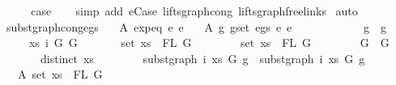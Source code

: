 \begin{isabellebody}
\ \ \isamarkupfalse%
\ \isamarkupfalse%
\ {\isacharquery}{\kern0pt}case\isanewline
\ \ \isamarkupfalse%
\ {\isacharparenleft}{\kern0pt}simp\ add{\isacharcolon}{\kern0pt}\ e{\isacharunderscore}{\kern0pt}Case\ lifts{\isacharunderscore}{\kern0pt}graph{\isacharunderscore}{\kern0pt}cong\ lifts{\isacharunderscore}{\kern0pt}graph{\isacharunderscore}{\kern0pt}freelinks{\isacharparenright}{\kern0pt}\isanewline
{}\isamarkupfalse%
\ auto%
\endisatagproof
{\isafoldproof}%
%
\isadelimproof
\isanewline
%
\endisadelimproof
\isanewline
\isanewline
{}\isamarkupfalse%
\ subst{\isacharunderscore}{\kern0pt}graph{\isacharunderscore}{\kern0pt}cong{\isacharunderscore}{\kern0pt}egs{}{\isacharcolon}{\kern0pt}\isanewline
\ \ \ A{}{\isacharcolon}{\kern0pt}\ {\isachardoublequoteopen}expeq\ e{}\ e{}{\isachardoublequoteclose}\isanewline
\ \ \ A{}{\isacharcolon}{\kern0pt}\ {\isachardoublequoteopen}{\isasymforall}{\isacharparenleft}{\kern0pt}g{}{\isacharcomma}{\kern0pt}\ g{}{\isacharparenright}{\kern0pt}{\isasymin}set\ {\isacharparenleft}{\kern0pt}egs\ e{}\ e{}{\isacharparenright}{\kern0pt}{\isachardot}{\kern0pt}\isanewline
\ \ \ \ \ \ \ \ \ \ \ \ g{}\ {\isasymsimeq}\ g{}\ {\isasymand}\isanewline
\ \ \ \ \ {\isacharparenleft}{\kern0pt}{\isasymforall}xs\ i\ G{}\ G{}{\isachardot}{\kern0pt}\isanewline
\ \ \ \ \ \ \ set\ xs\ {\isacharequal}{\kern0pt}\ FL\ G{}\ {\isacharminus}{\kern0pt}{\isacharminus}{\kern0pt}{\isachargreater}{\kern0pt}\isanewline
\ \ \ \ \ \ \ set\ xs\ {\isacharequal}{\kern0pt}\ FL\ G{}\ {\isacharminus}{\kern0pt}{\isacharminus}{\kern0pt}{\isachargreater}{\kern0pt}\isanewline
\ \ \ \ \ \ \ G{}\ {\isasymsimeq}\ G{}\ {\isacharminus}{\kern0pt}{\isacharminus}{\kern0pt}{\isachargreater}{\kern0pt}\isanewline
\ \ \ \ \ \ \ distinct\ xs\ {\isacharminus}{\kern0pt}{\isacharminus}{\kern0pt}{\isachargreater}{\kern0pt}\isanewline
\ \ \ \ \ \ \ subst{\isacharunderscore}{\kern0pt}graph\ i\ xs\ G{}\ g{}\ {\isasymsimeq}\ subst{\isacharunderscore}{\kern0pt}graph\ i\ xs\ G{}\ g{}{\isacharparenright}{\kern0pt}{\isachardoublequoteclose}\isanewline
\ \ \ A{}{\isacharcolon}{\kern0pt}\ {\isachardoublequoteopen}set\ xs\ {\isacharequal}{\kern0pt}\ FL\ G{}{\isachardoublequoteclose}\isanewline

\end{isabellebody}
